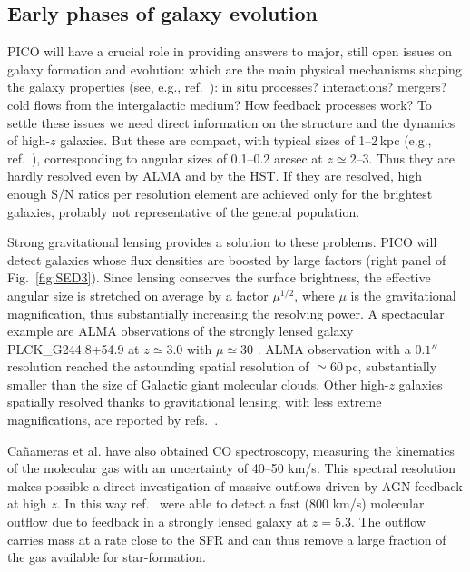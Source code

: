 \documentclass[11pt,a4paper]{article}
\begin{document}
\subsection{Early phases of galaxy evolution}

PICO will have a crucial role in providing answers to major, still open issues on galaxy formation and evolution: which are the main physical mechanisms shaping the galaxy properties (see, e.g., ref.~\cite{SilkMamon2012, SomervilleDave2015}): in situ processes? interactions? mergers? cold flows  from the intergalactic medium? How feedback processes work? To settle these issues we need direct information on the structure and the dynamics of high-$z$ galaxies. But these are compact, with typical sizes of 1--2\,kpc (e.g., ref.~\cite{Fujimoto2018}), corresponding to angular sizes of 0.1--0.2 arcsec at $z\simeq 2$--3. Thus they are hardly resolved even by ALMA and by the HST. If they are resolved, high enough S/N ratios per resolution element are achieved only for the brightest galaxies, probably not representative of the general population.

Strong gravitational lensing provides a solution to these problems. PICO will detect galaxies whose flux densities are boosted by large factors (right panel of Fig.~\ref{fig:SED3}). Since lensing conserves the surface brightness, the effective angular size is stretched on average by a factor $\mu^{1/2}$, where $\mu$ is the gravitational magnification, thus substantially increasing the resolving power. A spectacular example are ALMA observations of the strongly lensed galaxy PLCK\_G244.8\-+54.9 at $z \simeq 3.0$  with $\mu \simeq 30$ \cite{Canameras2017ALMA}. ALMA observation with a $0.1''$ resolution reached the astounding spatial resolution of $\simeq 60\,$pc, substantially smaller than the size of Galactic giant molecular clouds. Other high-$z$ galaxies spatially resolved thanks to gravitational lensing, with less extreme magnifications, are reported by refs.~\cite{Dye2018, Lamarche2018, Sharda2018}.

Ca\~{n}ameras et al. \cite{Canameras2017ALMA} have also obtained CO spectroscopy, measuring the kinematics of the molecular gas with an uncertainty of 40--50 km/s. This spectral resolution makes possible a direct investigation of massive outflows driven by AGN feedback at high $z$. In this way ref.~\cite{Spilker2018} were able to detect a fast (800 km/s) molecular outflow due to feedback in a strongly lensed galaxy at $z=5.3$. The outflow carries mass at a rate close to the SFR and can thus remove a large fraction of the gas available for star-formation.
\end{document}
